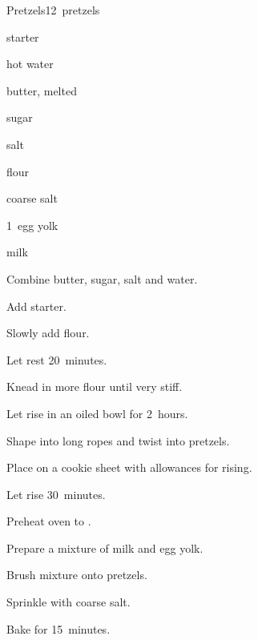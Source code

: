 \begin{recipe}{Pretzels}{}{12~pretzels}

\begin{ingredients}
\item {} starter
\item \C{\half} hot water
\item {} butter, melted
\item \Tp{1\half} sugar
\item {} salt
\item {} flour
\item coarse salt
\item 1~egg yolk
\item {} milk
\end{ingredients}

\begin{directions}
\item Combine butter, sugar, salt and water.
\item Add starter.
\item Slowly add  flour.
\item Let rest 20~minutes.
\item Knead in more flour until very stiff.
\item Let rise in an oiled bowl for 2~hours.
\item Shape into long ropes and twist into pretzels.
\item Place on a cookie sheet with allowances for rising.
\item Let rise 30~minutes.
\item Preheat oven to .
\item Prepare a mixture of milk and egg yolk.
\item Brush mixture onto pretzels.
\item Sprinkle with coarse salt.
\item Bake for 15~minutes.
\end{directions}
\end{recipe}
